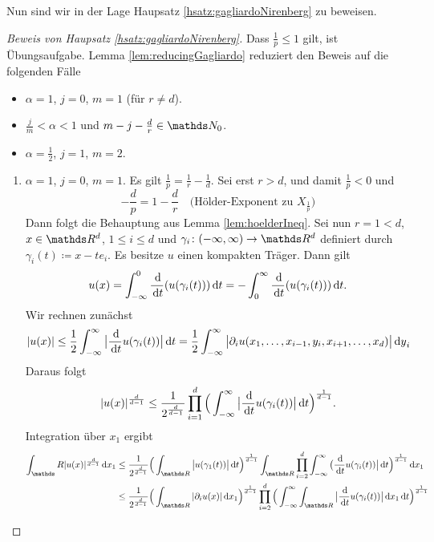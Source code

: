 Nun sind wir in der Lage Haupsatz \ref{hsatz:gagliardoNirenberg} zu beweisen.

\begin{proof}[Beweis von Haupsatz \ref{hsatz:gagliardoNirenberg}]
  Dass $\frac{1}{p} \leq 1$ gilt, ist Übungsaufgabe.
  Lemma \ref{lem:reducingGagliardo} reduziert den Beweis auf die folgenden Fälle
  \begin{itemize}
    \item $\alpha = 1$, $j = 0$, $m = 1$ (für $r \neq d$).
    \item $\frac{j}{m} < \alpha < 1$ und $m - j - \frac{d}{r} \in \N_0$.
    \item $\alpha = \frac{1}{2}$, $j = 1$, $m = 2$.
  \end{itemize}

  \begin{enumerate}
    \item $\alpha = 1$, $j = 0$, $m = 1$.
      Es gilt $\frac{1}{p} = \frac{1}{r} - \frac{1}{d}$.
      Sei erst $r > d$, und damit $\frac{1}{p} < 0$ und
      $$
      -\frac{d}{p} = 1 - \frac{d}{r} \quad\text{(Hölder-Exponent zu $X_{\frac{1}{p}}$)}
      $$
      Dann folgt die Behauptung aus Lemma \ref{lem:hoelderIneq}.
      Sei nun $r = 1 < d$, $x \in \R^d$, $1 \leq i \leq d$ und $\gamma_i \colon (-\infty, \infty) \to \R^d$ definiert durch $\gamma_i (t) \coloneqq x - t e_i$.
      Es besitze $u$ einen kompakten Träger. Dann gilt
      $$
      u(x) = \int_{-\infty}^0 \frac{\, {\operatorname{d}\!{}}}{\, {\operatorname{d}\!{t}}} (u(\gamma_i(t))) \, {\operatorname{d}\!{t}} = -\int_0^\infty \frac{\, {\operatorname{d}\!{}}}{\, {\operatorname{d}\!{t}}} (u(\gamma_i(t))) \, {\operatorname{d}\!{t}}.
      $$
      Wir rechnen zunächst
      $$
      |u(x)| \leq \frac{1}{2} \int_{-\infty}^\infty \big| \frac{\, {\operatorname{d}\!{}}}{\, {\operatorname{d}\!{t}}} u(\gamma_i(t)) \big| \, {\operatorname{d}\!{t}} = \frac{1}{2} \int_{-\infty}^\infty \big| \partial_i u(x_1,\dots,x_{i - 1},y_i,x_{i + 1}, \dots,x_d) \big| \, {\operatorname{d}\!{y}}_i
      $$
      Daraus folgt
      $$
      |u(x)|^{\frac{d}{d - 1}} \leq \frac{1}{2^{\frac{d}{d - 1}}} \prod_{i = 1}^d \Big( \int_{-\infty}^\infty \big| \frac{\, {\operatorname{d}\!{}}}{\, {\operatorname{d}\!{t}}} u(\gamma_i(t)) \big| \, {\operatorname{d}\!{t}} \Big)^{\frac{1}{d - 1}}.
      $$
      Integration über $x_1$ ergibt
      \begin{align*}
      \int_\R |u(x)|^{\frac{\d{}}{d - 1}} \d x_1 
      & \leq \frac{1}{2^{\frac{d}{d - 1}}} \Big( \int_{\R} \big| u(\gamma_1(t)) \big| \d t \Big)^{\frac{1}{d - 1}} \int_{\R} \prod_{i = 2}^d \int_{-\infty}^\infty \big( \frac{\d{}}{\d t} u(\gamma_i(t)) \big| \d t \Big)^{\frac{1}{d - 1}} \d x_1 \\
      &\leq \frac{1}{2^{\frac{d}{d - 1}}} \Big( \int_{\R} |\partial_i u(x)| \d x_1 \Big)^{\frac{1}{d - 1}} \prod_{i = 2}^d \Big(\int_{-\infty}^\infty \int_{\R} \big| \frac{\d{}}{\d t} u(\gamma_i(t)) \big| \d x_1 \d t \Big)^{\frac{1}{d - 1}}

\end{align*}
\end{enumerate}
\end{proof}
